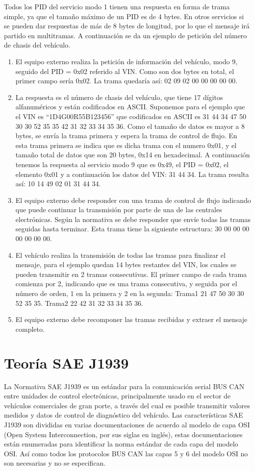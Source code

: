 Todos los PID del servicio modo 1 tienen una respuesta en forma de trama simple, ya que el tamaño máximo de un PID es de 4 bytes.
En otros servicios si se pueden dar respuestas de más de 8 bytes de longitud, por lo que el mensaje irá partido en multitramas. A continuación se da un ejemplo de petición del número de chasis del vehículo.

\begin{enumerate}
\item El equipo externo realiza la petición de información del vehículo, modo 9, seguido del PID = 0x02 referido al VIN. Como son dos bytes en total, el primer campo sería 0x02. La trama quedaría así: 02 09 02 00 00 00 00 00. 
\item La respuesta es el número de chasis del vehículo, que tiene 17 dígitos alfanuméricos y están codificados en ASCII. Suponemos para el ejemplo que el VIN es “1D4G00R55B123456” que codificados en ASCII es 31 44 34 47 50 30 30 52 35 35 42 31 32 33 34 35 36.
Como el tamaño de datos es mayor a 8 bytes, se envía la trama primera y espera la trama de control de flujo. En esta trama primera se indica que es dicha trama con el numero 0x01, y el tamaño total de datos que son 20 bytes, 0x14 en hexadecimal. A continuación tenemos la respuesta al servicio modo 9 que es 0x49, el PID = 0x02, el elemento 0x01 y a continuación los datos del VIN: 31 44 34.
La trama resulta así: 10 14 49 02 01 31 44 34.  
\item El equipo externo debe responder con una trama de control de flujo indicando que puede continuar la transmisión por parte de una de las centrales electrónicas. Según la normativa se debe responder que envíe todas las tramas seguidas hasta terminar. Esta trama tiene la siguiente estructura: 30 00  00 00 00 00 00 00.
\item El vehículo realiza la transmisión de todas las  tramas para finalizar el mensaje, para el ejemplo quedan 14 bytes restantes del VIN, los cuales se pueden transmitir en 2 tramas consecutivas. El primer campo de cada trama comienza por 2, indicando que es una trama consecutiva, y seguida por el número de orden, 1 en la primera y 2 en la segunda:
Trama1 21 47 50 30 30 52 35 35.
Trama2 22 42 31 32 33 34 35 36.
\item El equipo externo debe recomponer las tramas recibidas y extraer el mensaje completo.
\end{enumerate}

\section{Teoría SAE J1939}
La Normativa SAE J1939 es un estándar para la comunicación serial BUS CAN entre unidades de control electrónicas,  principalmente usado en el sector de vehículos comerciales de gran porte, a través del cual es posible transmitir valores medidos y datos de control de diagnóstico del vehículo.
Las características SAE  J1939 son divididas en varias documentaciones de acuerdo al modelo de capa OSI (Open System Interconnection, por sus siglas en inglés),  estas documentaciones están enumeradas para identificar la norma estándar de cada capa del modelo OSI.  Así como todos los protocolos BUS CAN las capas 5 y 6 del modelo OSI no son necesarias y no se especifican. 

